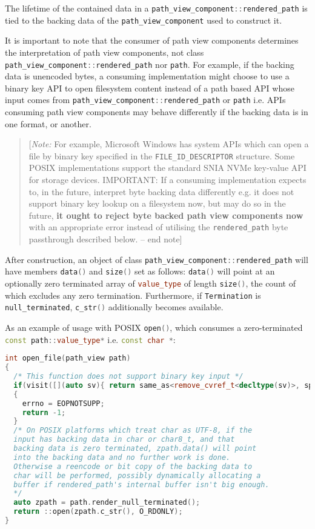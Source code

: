\documentclass[11pt]{article}
\newcommand{\code}[2][cpp]{\lstinline[language=#1,basicstyle=\small\ttfamily]{#2}}
\newcommand{\note}[1]{\begin{quote}[\textit{Note:} #1 -- end note]\end{quote}}
\begin{document}
The lifetime of the contained data in a \code{path_view_component::rendered_path} is tied to the backing data of the \code{path_view_component} used to construct it.

It is important to note that the consumer of path view components determines the interpretation of path view components, not class \code{path_view_component::rendered_path} nor \code{path}. For example, if the backing data is unencoded bytes, a consuming implementation might choose to use a binary key API to open filesystem content instead of a path based API whose input comes from \code{path_view_component::rendered_path} or \code{path} i.e. APIs consuming path view components may behave differently if the backing data is in one format, or another.

\note{For example, Microsoft Windows has system APIs which can open a file by binary key specified in the \code{FILE_ID_DESCRIPTOR} structure. Some POSIX implementations support the standard SNIA NVMe key-value API for storage devices. IMPORTANT: If a consuming implementation expects to, in the future, interpret byte backing data differently e.g. it does not support binary key lookup on a filesystem now, but may do so in the future, \textbf{it ought to reject byte backed path view components now} with an appropriate error instead of utilising the \code{rendered_path} byte passthrough described below.}

After construction, an object of class \code{path_view_component::rendered_path} will have members \code{data()} and \code{size()} set as follows: \code{data()} will point at an optionally zero terminated array of \code{value_type} of length \code{size()}, the count of which excludes any zero termination. Furthermore, if \code{Termination} is \code{null_terminated}, \code{c_str()} additionally becomes available.

As an example of usage with POSIX \code{open()}, which consumes a zero-terminated \code{const path::value_type*} i.e. \code{const char *}:

\begin{lstlisting}[language=cpp]
int open_file(path_view path)
{
  /* This function does not support binary key input */
  if(visit([](auto sv){ return same_as<remove_cvref_t<decltype(sv)>, span<const byte>>; }, path))
  {
    errno = EOPNOTSUPP;
    return -1;
  }
  /* On POSIX platforms which treat char as UTF-8, if the
  input has backing data in char or char8_t, and that
  backing data is zero terminated, zpath.data() will point
  into the backing data and no further work is done.
  Otherwise a reencode or bit copy of the backing data to
  char will be performed, possibly dynamically allocating a
  buffer if rendered_path's internal buffer isn't big enough.
  */
  auto zpath = path.render_null_terminated();
  return ::open(zpath.c_str(), O_RDONLY);
}
\end{lstlisting}
\end{document}
